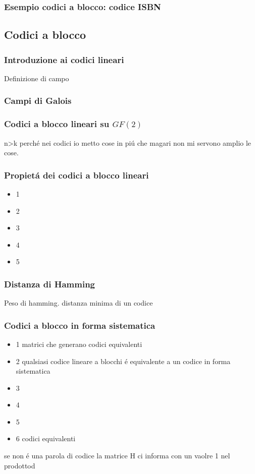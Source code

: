         \subsubsection{Esempio codici a blocco: codice ISBN}
    \subsection{Codici a blocco}
        \subsubsection{Introduzione ai codici lineari}
            {Definizione di campo}
        \subsubsection{Campi di Galois}

        \subsubsection{Codici a blocco lineari su $GF(2)$}
        n>k perché nei codici io metto cose in piú che magari non mi servono amplio le cose.\\


        \subsubsection{Propietá dei codici a blocco lineari}
            \begin{itemize}
                \item {1}
                \item {2}
                \item {3}
                \item {4}
                \item {5}
            \end{itemize}
        \subsubsection{Distanza di Hamming}
            

            Peso di hamming.
            distanza minima di un codice

        \subsubsection{Codici a blocco in forma sistematica}
            \begin{itemize}
                \item {1 matrici che generano codici equivalenti }
                \item {2 qualsiasi codice lineare a blocchi é equivalente a un codice in forma sistematica}
                \item {3}
                \item {4}
                \item {5}
                \item {6 codici equivalenti}
            \end{itemize}

        se non é una parola di codice la matrice H ci informa con un vaolre 1 nel prodottod